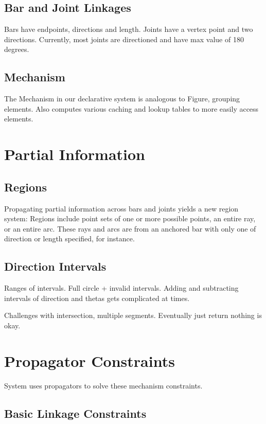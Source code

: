 \subsection{Bar and Joint Linkages}

Bars have endpoints, directions and length. Joints have a vertex point
and two directions. Currently, most joints are directioned and have
max value of 180 degrees.

\subsection{Mechanism}

The Mechanism in our declarative system is analogous to Figure,
grouping elements. Also computes various caching and lookup tables to
more easily access elements.

\section{Partial Information}

\subsection{Regions}

Propagating partial information across bars and joints yields a new
region system: Regions include point sets of one or more possible
points, an entire ray, or an entire arc. These rays and arcs are
from an anchored bar with only one of direction or length specified,
for instance.

\subsection{Direction Intervals}

Ranges of intervals. Full circle + invalid intervals. Adding and
subtracting intervals of direction and thetas gets complicated at times.

Challenges with intersection, multiple segments. Eventually just
return nothing is okay.

\section{Propagator Constraints}

System uses propagators to solve these mechanism constraints.

\subsection{Basic Linkage Constraints}


